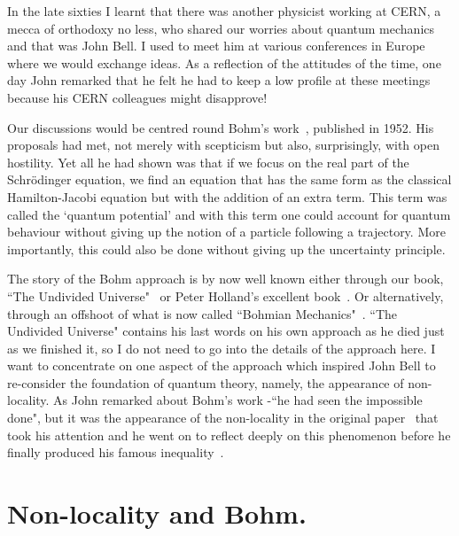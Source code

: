 \documentclass[11pt]{article}
\begin{document}
In the late sixties I learnt that there was another physicist working at CERN, a mecca of orthodoxy no less, who shared our worries about quantum mechanics and that was John Bell.  I used to meet him at various conferences in Europe where we would exchange ideas.  As a reflection of the attitudes of the time, one day John remarked that he felt he had to keep a low profile at these meetings because his CERN colleagues might disapprove!

 Our discussions would be centred round Bohm's work~\cite{db52}, 
 published in 1952.  His proposals had met, not merely with scepticism but also, surprisingly, with open hostility.  Yet all he had  shown was that if we focus on the real part of the Schr\"{o}dinger equation, we find an equation that has the same form as the classical Hamilton-Jacobi equation but with the addition of an extra term.  This term was called the `quantum potential'  and with this term one could account for quantum behaviour without giving up the notion of a particle following a trajectory.  More importantly, this could also be done without giving up the uncertainty principle.
 
The story of the Bohm approach is by now well known either through our book, ``The Undivided Universe"~\cite{dbbh93} or  Peter Holland's excellent book~\cite{ph95}.
Or alternatively, through an offshoot of what is now called ``Bohmian Mechanics"~\cite{ddst09}. 
  ``The Undivided Universe" contains his last words on his own approach as he died just as we finished it, so I do not need to go into the details of the approach here.   I want to concentrate on one aspect of the approach which inspired John Bell to re-consider the foundation of quantum theory, namely, the appearance of non-locality.  As John remarked about Bohm's work -``he had seen the impossible done", but it was the appearance of the non-locality in the original paper~\cite{db52} that took his attention and he went on  to reflect deeply on this phenomenon before he finally produced his famous inequality~\cite{jb64}.


\section{Non-locality and Bohm.}
\end{document}
